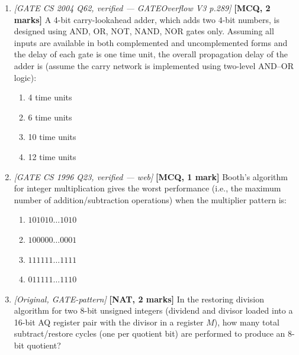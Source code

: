 \documentclass[11pt]{article}
\begin{document}
\begin{enumerate}
\item[\textbf{Q6}] \textit{[GATE CS 2004 Q62, verified --- GATEOverflow V3 p.289]} \textbf{[MCQ, 2 marks]} A 4-bit carry-lookahead adder, which adds two 4-bit numbers, is designed using AND, OR, NOT, NAND, NOR gates only. Assuming all inputs are available in both complemented and uncomplemented forms and the delay of each gate is one time unit, the overall propagation delay of the adder is (assume the carry network is implemented using two-level AND--OR logic):
\begin{enumerate}
  \item[(A)] 4 time units
  \item[(B)] 6 time units
  \item[(C)] 10 time units
  \item[(D)] 12 time units
\end{enumerate}

\item[\textbf{Q7}] \textit{[GATE CS 1996 Q23, verified --- web]} \textbf{[MCQ, 1 mark]} Booth's algorithm for integer multiplication gives the worst performance (i.e., the maximum number of addition/subtraction operations) when the multiplier pattern is:
\begin{enumerate}
  \item[(A)] $101010\ldots1010$
  \item[(B)] $100000\ldots0001$
  \item[(C)] $111111\ldots1111$
  \item[(D)] $011111\ldots1110$
\end{enumerate}

\item[\textbf{Q8}] \textit{[Original, GATE-pattern]} \textbf{[NAT, 2 marks]} In the restoring division algorithm for two 8-bit unsigned integers (dividend and divisor loaded into a 16-bit AQ register pair with the divisor in a register $M$), how many total subtract/restore cycles (one per quotient bit) are performed to produce an 8-bit quotient?

\end{enumerate}
\end{document}
